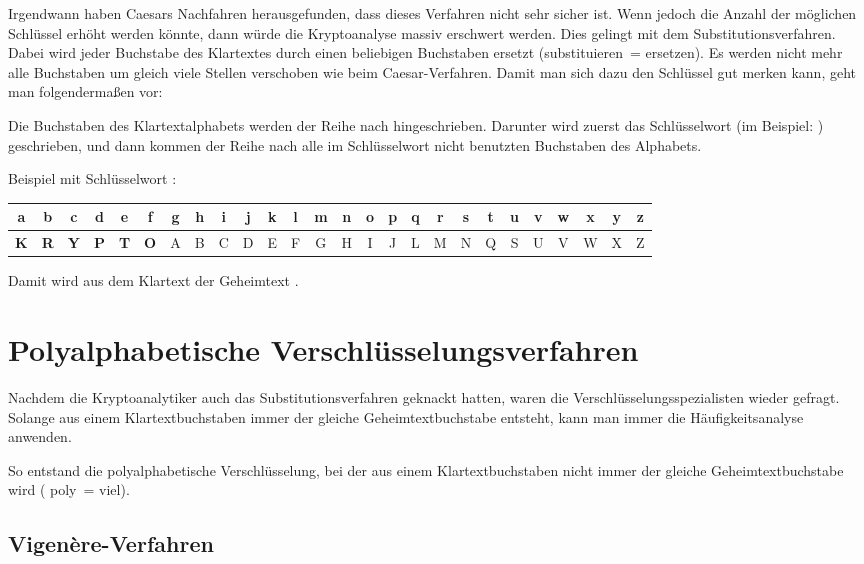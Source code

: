 Irgendwann haben Caesars Nachfahren herausgefunden, dass dieses Verfahren nicht
sehr sicher ist. Wenn jedoch die Anzahl der möglichen Schlüssel erhöht werden
könnte, dann würde die Kryptoanalyse massiv erschwert werden. Dies gelingt mit
dem Substitutionsverfahren. Dabei wird jeder Buchstabe des Klartextes durch
einen beliebigen Buchstaben ersetzt (\glqq substituieren\grqq\ =
\glqq ersetzen\grqq ). Es werden nicht mehr alle Buchstaben um gleich viele
Stellen verschoben wie beim Caesar-Verfahren. Damit man sich dazu den Schlüssel
gut merken kann, geht man folgendermaßen vor:

Die Buchstaben des Klartextalphabets werden der Reihe nach hingeschrieben.
Darunter wird zuerst das Schlüsselwort (im Beispiel: )
geschrieben, und dann kommen der Reihe nach alle im Schlüsselwort nicht
benutzten Buchstaben des Alphabets.

Beispiel mit Schlüsselwort :	

\bgroup
\def\arraystretch{1.2}
\setlength{\tabcolsep}{.5em}
\begin{tabular}{|c|c|c|c|c|c|c|c|c|c|c|c|c|c|c|c|c|c|c|c|c|c|c|c|c|c|}\hline
a & b & c & d & e & f & g & h & i & j & k & l & m & n & o & p & q & r & s
& t & u & v & w & x & y & z \\ \hline
\textbf{K} & \textbf{R} & \textbf{Y} & \textbf{P} & \textbf{T} & \textbf{O} & A
& B & C & D & E & F & G & H & I & J & L & M & N & Q & S & U & V & W & X & Z \\
\hline
\end{tabular}
\egroup

Damit wird aus dem Klartext  der Geheimtext
.


\section{Polyalphabetische Verschlüsselungsverfahren}

Nachdem die Kryptoanalytiker auch das Substitutionsverfahren geknackt hatten,
waren die Verschlüsselungsspezialisten wieder gefragt. Solange aus einem
Klartextbuchstaben immer der gleiche Geheimtextbuchstabe entsteht, kann man
immer die Häufigkeitsanalyse anwenden.

So entstand die polyalphabetische Verschlüsselung, bei der aus einem
Klartextbuchstaben nicht immer der gleiche Geheimtextbuchstabe wird (\glqq
poly\grqq\ = \glqq viel\grqq ).

\subsection{Vigenère-Verfahren}

